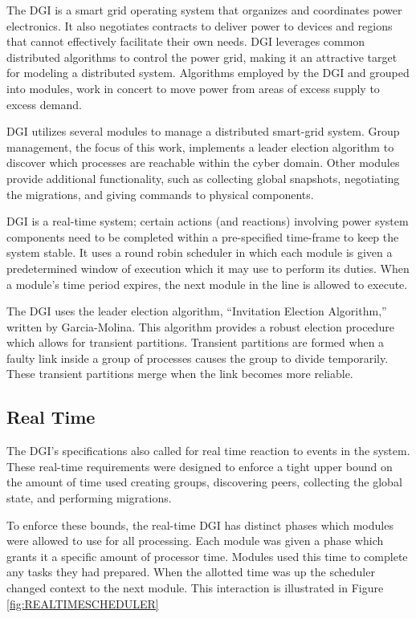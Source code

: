 The DGI is a smart grid operating system that organizes and coordinates power electronics.
It also negotiates contracts to deliver power to devices and regions that cannot effectively facilitate their own needs.
DGI leverages common distributed algorithms to control the power grid, making it an attractive target for modeling a distributed system.
Algorithms employed by the \ac{DGI} and grouped into modules, work in concert to move power from areas of excess supply to excess demand.

DGI utilizes several modules to manage a distributed smart-grid system.
Group management, the focus of this work, implements a leader election algorithm to discover which processes are reachable within the cyber domain.
Other modules provide additional functionality, such as collecting global snapshots, negotiating the migrations, and giving commands to physical components.

DGI is a real-time system; certain actions (and reactions) involving power system components need to be completed within a pre-specified time-frame to keep the system stable.
It uses a round robin scheduler in which each module is given a predetermined window of execution which it may use to perform its duties.
When a module's time period expires, the next module in the line is allowed to execute. 

The DGI uses the leader election algorithm, ``Invitation Election Algorithm,'' written by Garcia-Molina\cite{INVITATIONELECTION}.
This algorithm provides a robust election procedure which allows for transient partitions.
Transient partitions are formed when a faulty link inside a group of processes causes the group to divide temporarily.
These transient partitions merge when the link becomes more reliable.

\subsection{Real Time}
The \ac{DGI}'s specifications also called for real time reaction to events in the system.
These real-time requirements were designed to enforce a tight upper bound on the amount of time used creating groups, discovering peers, collecting the global state, and performing migrations.

To enforce these bounds, the real-time DGI has distinct phases which modules were allowed to use for all processing.
Each module was given a phase which grants it a specific amount of processor time.
Modules used this time to complete any tasks they had prepared.
When the allotted time was up the scheduler changed context to the next module.
This interaction is illustrated in Figure \ref{fig:REALTIMESCHEDULER}

